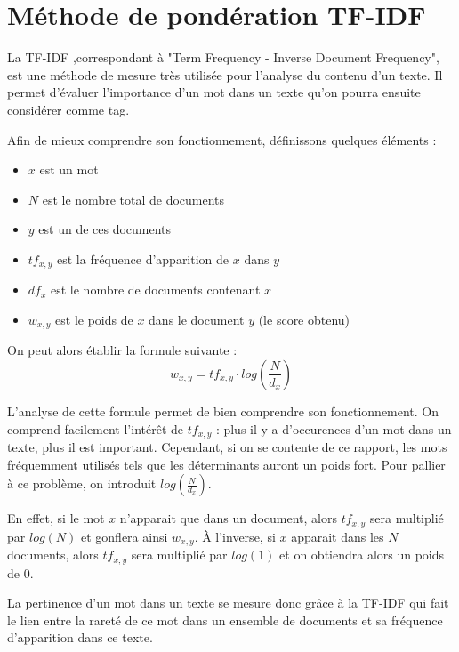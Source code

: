 \section{Méthode de pondération TF-IDF}
La TF-IDF ,correspondant à "Term Frequency - Inverse Document Frequency", est une méthode de mesure très utilisée pour l'analyse du contenu d'un texte. Il permet d'évaluer l'importance d'un mot dans un texte qu'on pourra ensuite considérer comme tag.\par
Afin de mieux comprendre son fonctionnement, définissons quelques éléments :\par
\begin{itemize}
	\item $x$ est un mot
	\item $N$ est le nombre total de documents
	\item $y$ est un de ces documents
	\item $tf_{x, y}$ est la fréquence d'apparition de $x$ dans $y$
	\item $df_{x}$ est le nombre de documents contenant $x$
	\item $w_{x, y}$ est le poids de $x$ dans le document $y$ (le score obtenu)
\end{itemize}
\vspace{0.5cm}
On peut alors établir la formule suivante :
$$w_{x, y}=tf_{x, y} \cdot log(\frac{N}{d_{x}})$$

L'analyse de cette formule permet de bien comprendre son fonctionnement. On comprend facilement l'intérêt de $tf_{x, y}$ : plus il y a d'occurences d'un mot dans un texte, plus il est important. Cependant, si on se contente de ce rapport, les mots fréquemment utilisés tels que les déterminants auront un poids fort.
Pour pallier à ce problème, on introduit $log(\frac{N}{d_{x}})$.\par En effet, si le mot $x$ n'apparait que dans un document, alors $tf_{x, y}$ sera multiplié par $log(N)$ et gonflera ainsi $w_{x, y}$. À l'inverse, si $x$ apparait dans les $N$ documents, alors $tf_{x, y}$ sera multiplié par $log(1)$ et on obtiendra alors un poids de 0.\par
La pertinence d'un mot dans un texte se mesure donc grâce à la TF-IDF qui fait le lien entre la rareté de ce mot dans un ensemble de documents et sa fréquence d'apparition dans ce texte.
